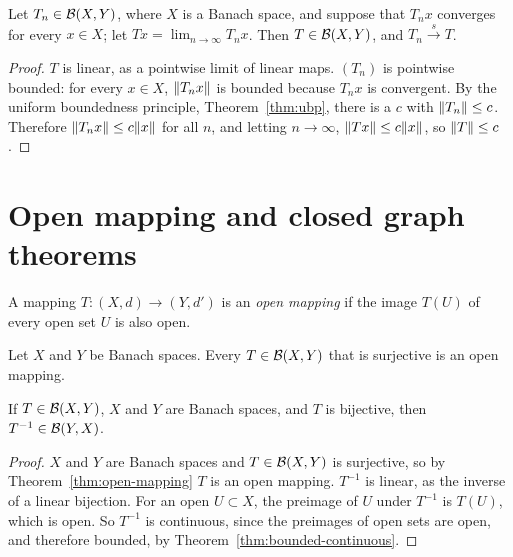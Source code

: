 \begin{proposition}\label{prop:strong-limit}
Let $T_n \in \mathcal{B}(X, Y)$, where $X$ is a Banach space, and suppose that
$T_n x$ converges for every $x \in X$; let $Tx = \lim_{n \to \infty} T_n x$.
Then $T \in \mathcal{B}(X, Y)$, and $T_n \xrightarrow{s} T$.
\end{proposition}

\begin{proof}
$T$ is linear, as a pointwise limit of linear maps. $(T_n)$ is pointwise
bounded: for every $x \in X$, $\lVert T_n x\rVert$ is bounded because $T_n x$ is
convergent. By the uniform boundedness principle, Theorem~\ref{thm:ubp},
there is a $c$ with $\lVert T_n\rVert \le c$. Therefore
$\lVert T_n x\rVert \le c \lVert x\rVert$ for all $n$, and letting $n \to \infty$,
$\lVert Tx\rVert \le c\lVert x\rVert$, so $\lVert T\rVert \le c$.
\end{proof}

\section{Open mapping and closed graph theorems}

\begin{definition}\label{def:open-mapping}
A mapping $T \colon (X,d) \to (Y,d')$ is an \emph{open mapping} if the image
$T(U)$ of every open set $U$ is also open.
\end{definition}

\begin{theorem}\label{thm:open-mapping}
Let $X$ and $Y$ be Banach spaces. Every $T \in \mathcal{B}(X, Y)$ that is
surjective is an open mapping.
\end{theorem}

\begin{corollary}\label{cor:bounded-inverse}
If $T \in \mathcal{B}(X, Y)$, $X$ and $Y$ are Banach spaces, and $T$ is bijective,
then $T^{-1} \in \mathcal{B}(Y, X)$.
\end{corollary}

\begin{proof}
$X$ and $Y$ are Banach spaces and $T \in \mathcal{B}(X, Y)$ is surjective, so by
Theorem~\ref{thm:open-mapping} $T$ is an open mapping. $T^{-1}$ is linear,
as the inverse of a linear bijection. For an open $U \subset X$, the preimage
of $U$ under $T^{-1}$ is $T(U)$, which is open. So $T^{-1}$ is continuous,
since the preimages of open sets are open, and therefore bounded, by
Theorem~\ref{thm:bounded-continuous}.
\end{proof}


